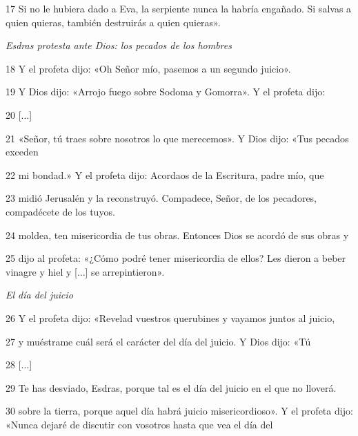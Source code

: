 \par 17 Si no le hubiera dado a Eva, la serpiente nunca la habría engañado. Si salvas a quien quieras, también destruirás a quien quieras».

\par \textit{Esdras protesta ante Dios: los pecados de los hombres}

\par 18 Y el profeta dijo: «Oh Señor mío, pasemos a un segundo juicio».

\par 19 Y Dios dijo: «Arrojo fuego sobre Sodoma y Gomorra». Y el profeta dijo:

\par 20 [...]

\par 21 «Señor, tú traes sobre nosotros lo que merecemos». Y Dios dijo: «Tus pecados exceden

\par 22 mi bondad.» Y el profeta dijo: Acordaos de la Escritura, padre mío, que

\par 23 midió Jerusalén y la reconstruyó. Compadece, Señor, de los pecadores, compadécete de los tuyos.

\par 24 moldea, ten misericordia de tus obras. Entonces Dios se acordó de sus obras y

\par 25 dijo al profeta: «¿Cómo podré tener misericordia de ellos? Les dieron a beber vinagre y hiel y [...] se arrepintieron».

\par \textit{El día del juicio}

\par 26 Y el profeta dijo: «Revelad vuestros querubines y vayamos juntos al juicio,

\par 27 y muéstrame cuál será el carácter del día del juicio. Y Dios dijo: «Tú

\par 28 [...]

\par 29 Te has desviado, Esdras, porque tal es el día del juicio en el que no lloverá.

\par 30 sobre la tierra, porque aquel día habrá juicio misericordioso». Y el profeta dijo: «Nunca dejaré de discutir con vosotros hasta que vea el día del

